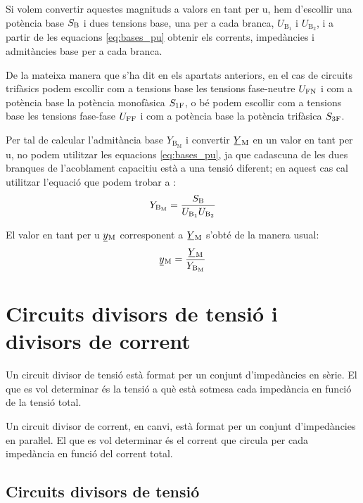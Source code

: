 Si volem convertir aquestes magnituds a valors en tant per u, hem d'escollir  una potència base $S_\mathrm{B}$ i dues tensions base, una  per a cada branca, $U_{\text{B}_1}$ i  $U_{\text{B}_2}$, i a partir de les equacions \eqref{eq:bases_pu} obtenir els corrents, impedàncies i admitàncies base per a cada branca.

De la mateixa manera que s'ha dit en els apartats anteriors, en el cas de circuits trifàsics podem escollir com a tensions base les tensions fase-neutre $U_\mathrm{FN}$ i com a potència base la potència  monofàsica $S_\mathrm{1F}$, o bé podem escollir com a tensions base les tensions fase-fase $U_\mathrm{FF}$ i com a potència base la potència trifàsica $S_\mathrm{3F}$.


Per tal de  calcular l'admitància base $Y_{\text{B}_\text{M}}$ i convertir $\cmplx{Y}\ped{M}$ en un valor en tant per u, no podem utilitzar les equacions \eqref{eq:bases_pu}, ja que cadascuna de les dues branques de l'acoblament capacitiu està a una tensió diferent; en aquest cas cal utilitzar l'equació que podem trobar a \cite{TLE}:
\begin{equation}
    Y_{\text{B}_\text{M}} = \frac{S_\mathrm{B}}{U_{\text{B}_1} U_{\text{B}_2}}
\end{equation}

El valor en tant per u $\cmplx{y}\ped{M}$ corresponent a $\cmplx{Y}\ped{M}$ s'obté de la manera usual:
\begin{equation}
    \cmplx{y}\ped{M} = \frac{\cmplx{Y}\ped{M}}{Y_{\text{B}_\text{M}}}
\end{equation}


\section{Circuits divisors de tensió i divisors de corrent}\label{sec:div_tens_corr}

Un circuit divisor de tensió està format per un conjunt
d'impedàncies en sèrie. El que es vol determinar  és  la
tensió a què està sotmesa cada impedància en funció de la tensió total.

Un circuit divisor de corrent, en canvi, està format per un conjunt
d'impedàncies en paraŀlel. El que es vol determinar és el
corrent que circula per cada impedància en funció del corrent
total.

\subsection{Circuits divisors de tensió}\label{sec:circ-div-tens}

